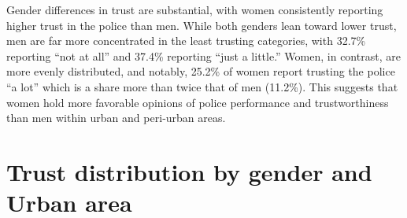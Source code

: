 \documentclass[
  letterpaper,
  DIV=11,
  numbers=noendperiod]{scrartcl}
\begin{document}
Gender differences in trust are substantial, with women consistently
reporting higher trust in the police than men. While both genders lean
toward lower trust, men are far more concentrated in the least trusting
categories, with 32.7\% reporting ``not at all'' and 37.4\% reporting
``just a little.'' Women, in contrast, are more evenly distributed, and
notably, 25.2\% of women report trusting the police ``a lot'' which is a
share more than twice that of men (11.2\%). This suggests that women
hold more favorable opinions of police performance and trustworthiness
than men within urban and peri‑urban areas.

\section{Trust distribution by gender and Urban
area}\label{trust-distribution-by-gender-and-urban-area}
\end{document}
